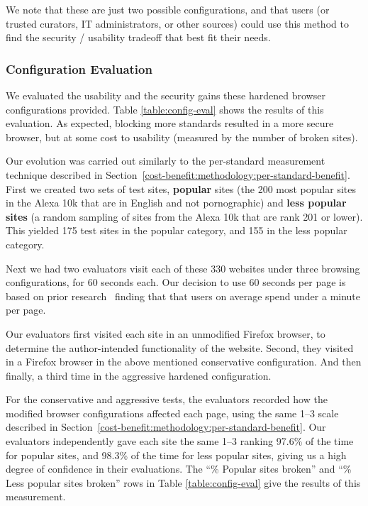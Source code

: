 We note that these are just two possible configurations, and that users
(or trusted curators, IT administrators, or other sources) could
use this method to find the security / usability tradeoff that best fit their needs.


\subsubsection{Configuration Evaluation}
\label{current-web:extension:configuration-evaluations}


We evaluated the usability and the security gains these hardened browser
configurations provided.  Table \ref{table:config-eval}
shows the results of this evaluation.  As expected, blocking more standards
resulted in a more secure browser, but at some cost to usability (measured
by the number of broken sites).

Our evolution was carried out similarly to the per-standard measurement
technique described in Section~\ref{cost-benefit:methodology:per-standard-benefit}.  First
we created two sets of test sites, \textbf{popular} sites (the 200 most popular
sites in the Alexa 10k that are in English and not pornographic) and
\textbf{less popular sites} (a random sampling of sites from the Alexa 10k that
are rank 201 or lower).  This yielded 175 test sites in the popular category,
and 155 in the less popular category.

Next we had two evaluators visit each of these 330 websites under three browsing
configurations, for 60 seconds each.  Our decision to use 60 seconds per page
is based on prior research~\cite{liu2010understanding} finding that
that users on average spend under a minute per page.

Our evaluators first visited each site in an unmodified
Firefox browser, to determine the author-intended functionality of the website.
Second, they visited in a Firefox browser in the above mentioned conservative
configuration.  And then finally, a third time in the aggressive hardened
configuration.

For the conservative and aggressive tests, the evaluators recorded how the
modified browser configurations affected each page, using the same 1--3 scale
described in Section~\ref{cost-benefit:methodology:per-standard-benefit}.  Our evaluators
independently gave each site the same 1--3 ranking 97.6\% of the time for
popular sites, and 98.3\% of the time for less popular sites, giving us
a high degree of confidence in their evaluations.  The ``\% Popular sites
broken'' and ``\% Less popular sites broken'' rows in Table
\ref{table:config-eval} give the results of this measurement.


